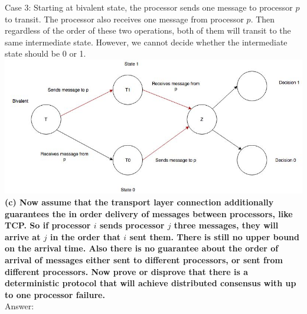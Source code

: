 \documentclass{article}
\begin{document}
Case 3: Starting at bivalent state, the processor sends one message to processor $p$ to transit. The processor also receives one message from processor $p$. Then regardless of the order of these two operations, both of them will transit to the same intermediate state. However, we cannot decide whether the intermediate state should be 0 or 1.\\ \newline
\includegraphics[width=0.9\columnwidth]{case3.jpg}\\ \newline 
\textbf{(c) Now assume that the transport layer connection additionally guarantees the in order delivery of messages between processors, like TCP. So if processor $i$ sends processor $j$ three messages, they will arrive at $j$ in the order that $i$ sent them. There is still no upper bound on the arrival time. Also there is no guarantee about the order of arrival of messages either sent to different processors, or sent from different processors. Now prove or disprove that there is a deterministic protocol that will achieve distributed consensus with up to one processor failure.}\\ \newline
Answer:
\end{document}
